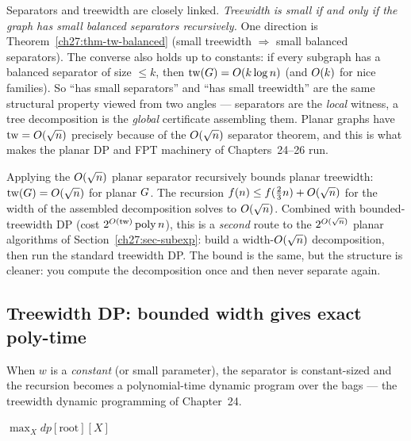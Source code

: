 \begin{connectionbox}
Separators and treewidth are closely linked. \emph{Treewidth is small if and only if the graph has small balanced separators recursively.} One direction is Theorem~\ref{ch27:thm-tw-balanced} (small treewidth $\Rightarrow$ small balanced separators). The converse also holds up to constants: if every subgraph has a balanced separator of size $\le k$, then $\operatorname{tw}(G)=O(k\log n)$ (and $O(k)$ for nice families). So ``has small separators'' and ``has small treewidth'' are the same structural property viewed from two angles --- separators are the \emph{local} witness, a tree decomposition is the \emph{global} certificate assembling them. Planar graphs have $\operatorname{tw}=O(\sqrt n)$ precisely because of the $O(\sqrt n)$ separator theorem, and this is what makes the planar DP and FPT machinery of Chapters~24--26 run.
\end{connectionbox}

\begin{example}\label{ch27:ex-planar-tw}
Applying the $O(\sqrt n)$ planar separator recursively bounds planar treewidth: $\operatorname{tw}(G)=O(\sqrt n)$ for planar $G$. The recursion $f(n)\le f(\tfrac23 n)+O(\sqrt n)$ for the width of the assembled decomposition solves to $O(\sqrt n)$. Combined with bounded-treewidth DP (cost $2^{O(\operatorname{tw})}\operatorname{poly} n$), this is a \emph{second} route to the $2^{O(\sqrt n)}$ planar algorithms of Section~\ref{ch27:sec-subexp}: build a width-$O(\sqrt n)$ decomposition, then run the standard treewidth DP. The bound is the same, but the structure is cleaner: you compute the decomposition once and then never separate again.
\end{example}

\subsection{Treewidth DP: bounded width gives exact poly-time}

When $w$ is a \emph{constant} (or small parameter), the separator is constant-sized and the recursion becomes a polynomial-time dynamic program over the bags --- the treewidth dynamic programming of Chapter~24.

\begin{algorithm}[H]
\caption{\textsc{TreewidthDP} skeleton --- weighted independent set, width $w$}
\label{ch27:alg-twdp}
\DontPrintSemicolon
{}
\Return $\max_X \textit{dp}[\text{root}][X]$\;
\end{algorithm}

